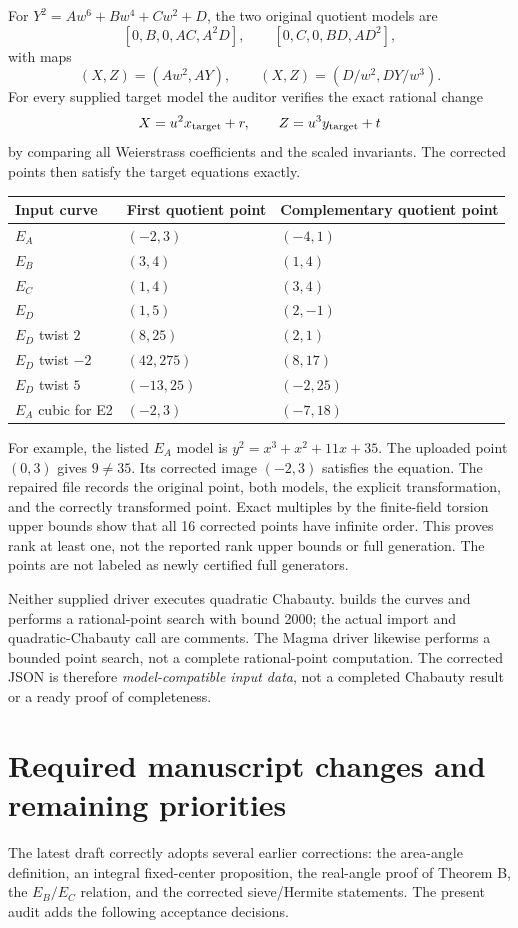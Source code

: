 \documentclass[11pt]{article}
\theoremstyle{remark}\newtheorem{remark}[theorem]{Remark}
\begin{document}
For $Y^2=A w^6+B w^4+Cw^2+D$, the two original quotient models are
\[
[0,B,0,AC,A^2D],\qquad [0,C,0,BD,AD^2],
\]
with maps
\[
(X,Z)=(Aw^2,AY),\qquad (X,Z)=(D/w^2,DY/w^3).
\]
For every supplied target model the auditor verifies the exact rational change
\[
X=u^2x_{\rm target}+r,\qquad Z=u^3y_{\rm target}+t
\]
by comparing all Weierstrass coefficients and the scaled invariants. The corrected points then satisfy the target equations exactly.

\begin{center}
\small\renewcommand{\arraystretch}{1.15}
\begin{tabular}{lll}
\toprule
Input curve & First quotient point & Complementary quotient point\\
\midrule
$E_A$ & $(-2,3)$ & $(-4,1)$\\
$E_B$ & $(3,4)$ & $(1,4)$\\
$E_C$ & $(1,4)$ & $(3,4)$\\
$E_D$ & $(1,5)$ & $(2,-1)$\\
$E_D$ twist $2$ & $(8,25)$ & $(2,1)$\\
$E_D$ twist $-2$ & $(42,275)$ & $(8,17)$\\
$E_D$ twist $5$ & $(-13,25)$ & $(-2,25)$\\
$E_A$ cubic for E2 & $(-2,3)$ & $(-7,18)$\\
\bottomrule
\end{tabular}
\end{center}
For example, the listed $E_A$ model is $y^2=x^3+x^2+11x+35$. The uploaded point $(0,3)$ gives $9\ne35$. Its corrected image $(-2,3)$ satisfies the equation. The repaired file records the original point, both models, the explicit transformation, and the correctly transformed point. Exact multiples by the finite-field torsion upper bounds show that all 16 corrected points have infinite order. This proves rank at least one, not the reported rank upper bounds or full generation. The points are not labeled as newly certified full generators.

Neither supplied driver executes quadratic Chabauty.  builds the curves and performs a rational-point search with bound 2000; the actual import and quadratic-Chabauty call are comments. The Magma driver likewise performs a bounded point search, not a complete rational-point computation. The corrected JSON is therefore \emph{model-compatible input data}, not a completed Chabauty result or a ready proof of completeness.

\section{Required manuscript changes and remaining priorities}
The latest draft correctly adopts several earlier corrections: the area-angle definition, an integral fixed-center proposition, the real-angle proof of Theorem B, the $E_B/E_C$ relation, and the corrected sieve/Hermite statements. The present audit adds the following acceptance decisions.
\end{document}
